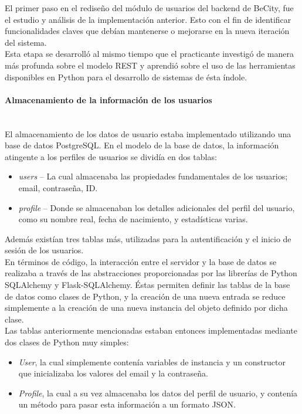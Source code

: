 \documentclass[11pt,letterpaper]{article}
\begin{document}
El primer paso en el rediseño del módulo de usuarios del backend de BeCity, fue el estudio y análisis de la implementación anterior. Esto con el fin de identificar funcionalidades claves que debían mantenerse o mejorarse en la nueva iteración del sistema.\\
Esta etapa se desarrolló al mismo tiempo que el practicante investigó de manera más profunda sobre el modelo REST y aprendió sobre el uso de las herramientas disponibles en Python para el desarrollo de sistemas de ésta índole.\\



\paragraph{Almacenamiento de la información de los usuarios\\\\}

El almacenamiento de los datos de usuario estaba implementado utilizando una base de datos PostgreSQL.
En el modelo de la base de datos, la información atingente a los perfiles de usuarios se dividía en dos tablas:

\begin{itemize}
    \item \emph{users} -- La cual almacenaba las propiedades fundamentales de los usuarios; email, contraseña, ID.
    \item \emph{profile} -- Donde se almacenaban los detalles adicionales del perfil del usuario, como su nombre real, fecha de nacimiento, y estadísticas varias.
\end{itemize}

Además existían tres tablas más, utilizadas para la autentificación y el inicio de sesión de los usuarios.\\

En términos de código, la interacción entre el servidor y la base de datos se realizaba a través de las abstracciones proporcionadas por las librerías de Python SQLAlchemy y Flask-SQLAlchemy. Éstas permiten definir las tablas de la base de datos como clases de Python, y la creación de una nueva entrada se reduce simplemente a la creación de una nueva instancia del objeto definido por dicha clase.\\
Las tablas anteriormente mencionadas estaban entonces implementadas mediante dos clases de Python muy simples:
\begin{itemize}
    \item \emph{User}, la cual simplemente contenía variables de instancia y un constructor que inicializaba los valores del email y la contraseña.
    \item \emph{Profile}, la cual a su vez almacenaba los datos del perfil de usuario, y contenía un método para pasar esta información a un formato JSON.
\end{itemize}
\newpage
\end{document}
